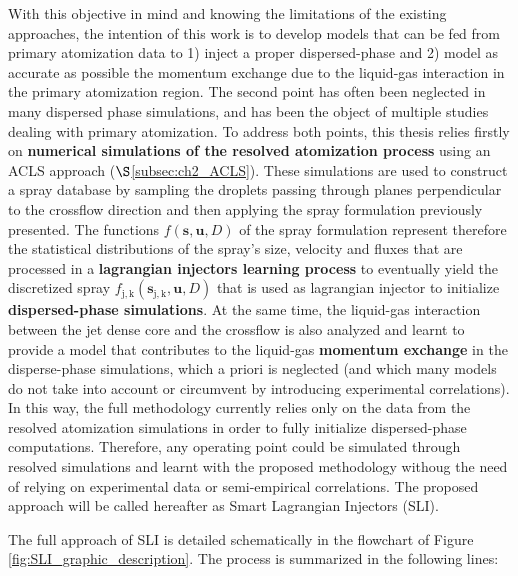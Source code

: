 With this objective in mind and knowing the limitations of the existing approaches, the intention of this work is to develop models that can be fed from primary atomization data to 1) inject a proper dispersed-phase and 2) model as accurate as possible the momentum exchange due to the liquid-gas interaction in the primary atomization region. The second point has often been neglected in many dispersed phase simulations, and has been the object of multiple studies dealing with primary atomization. To address both points, this thesis relies firstly on \textbf{numerical simulations of the resolved atomization process} using an ACLS approach ($\S$\ref{subsec:ch2_ACLS}). These simulations are used to construct a spray database by sampling the droplets passing through planes perpendicular to the crossflow direction and then applying the spray formulation previously presented. The functions $f \left( \boldsymbol{s}, \boldsymbol{u}, D \right) $ of the spray formulation represent therefore the statistical distributions of the spray's size, velocity and fluxes that are processed in a \textbf{lagrangian injectors learning process} to eventually yield the discretized spray $f_\mathrm{j,k} \left( \boldsymbol{s}_\mathrm{j,k}, \boldsymbol{u}, D \right)$ that is used as lagrangian injector to initialize \textbf{dispersed-phase simulations}. At the same time, the liquid-gas interaction between the jet dense core and the crossflow is also analyzed and learnt to provide a model that contributes to the liquid-gas \textbf{momentum exchange} in the disperse-phase simulations, which a priori is neglected (and which many models do not take into account or circumvent by introducing experimental correlations). In this way, the full methodology currently relies only on the data from the resolved atomization simulations in order to fully initialize dispersed-phase computations. Therefore, any operating point could be simulated through resolved simulations and learnt with the proposed methodology withoug the need of relying on experimental data or semi-empirical correlations. The proposed approach will be called hereafter as Smart Lagrangian Injectors (SLI).

The full approach of SLI is detailed schematically in the flowchart of Figure \ref{fig:SLI_graphic_description}. The process is summarized in the following lines:


